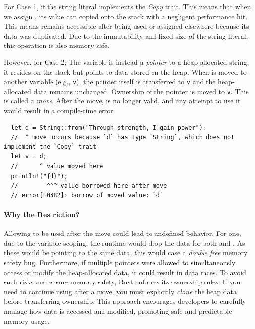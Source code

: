 \documentclass[11pt]{report}
\theoremstyle{definition}
\theoremstyle{plain}
\begin{document}
For Case 1, if the string literal  implements the \textit{Copy} trait. This means that when we assign , its value can copied onto the stack with a negligent performance hit. This means  remains accessible after being used or assigned elsewhere because its data was duplicated. Due to the immutability and fixed size of the string literal, this operation is also memory safe.

However, for Case 2; The variable  is instead a \textit{pointer} to a heap-allocated string, it resides on the stack but points to data stored on the heap. When  is moved to another variable (e.g., \texttt{v}), the pointer itself is transferred to \texttt{v} and the heap-allocated data remains unchanged. Ownership of the pointer is moved to \texttt{v}. This is called a \textit{move}. After the move,  is no longer valid, and any attempt to use it would result in a compile-time error.
\begin{verbatim}
  let d = String::from("Through strength, I gain power");
  //  ^ move occurs because `d` has type `String`, which does not implement the `Copy` trait
  let v = d;
  //      ^ value moved here
  println!("{d}"); 
  //        ^^^ value borrowed here after move
  // error[E0382]: borrow of moved value: `d`
\end{verbatim}

\paragraph{Why the Restriction?}

Allowing  to be used after the move could lead to undefined behavior. For one, due to the variable scoping, the runtime would drop the data for both  and . As these would be pointing to the same data, this would case a \textit{double free} memory safety bug. Furthermore, if multiple pointers were allowed to simultaneously access or modify the heap-allocated data, it could result in data races. To avoid such risks and ensure memory safety, Rust enforces its ownership rules. If you need to continue using  after a move, you must explicitly \textit{clone} the heap data before transferring ownership. This approach encourages developers to carefully manage how data is accessed and modified, promoting safe and predictable memory usage.
\end{document}
